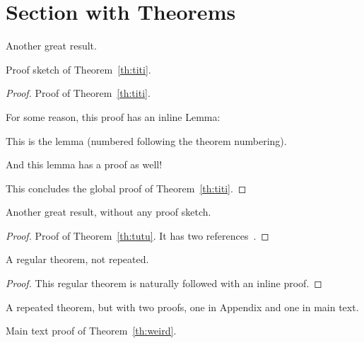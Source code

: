 \section{Section with Theorems}

\begin{theoremrep}
  \label{th:titi}
  Another great result.
\end{theoremrep}

\begin{proofsketch}
  Proof sketch of Theorem~\ref{th:titi}.
\end{proofsketch}

\begin{proof}
  Proof of Theorem~\ref{th:titi}.

  For some reason, this proof has an inline Lemma:
  \begin{lemma}
    This is the lemma (numbered following the theorem numbering).
  \end{lemma} 

  \begin{nestedproof}
    And this lemma has a proof as well!
  \end{nestedproof}

  This concludes the global proof of Theorem~\ref{th:titi}.
\end{proof}

\begin{theoremrep}
  \label{th:tutu}
  Another great result, without any proof sketch.
\end{theoremrep}

\begin{proof}
  Proof of Theorem~\ref{th:tutu}. It has two
  references~\cite{sitemaps,brin1998anatomy}.
\end{proof}

\begin{theorem}
  A regular theorem, not repeated.
\end{theorem}

\begin{proof}
This regular theorem is naturally followed with an inline proof.
\end{proof}

\begin{theoremrep}
  \label{th:weird}
  A repeated theorem, but with two proofs, one in Appendix and one in
  main text.
\end{theoremrep}

\begin{inlineproof}
  Main text proof of Theorem~\ref{th:weird}.
\end{inlineproof}

